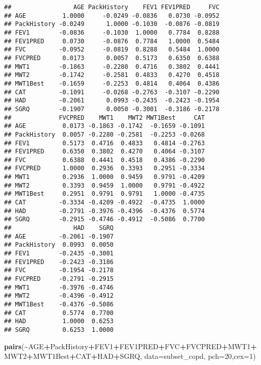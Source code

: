\documentclass[
]{article}
\newenvironment{Shaded}{\begin{snugshade}}{\end{snugshade}}
\newcommand{\AttributeTok}[1]{\textcolor[rgb]{0.13,0.29,0.53}{#1}}
\newcommand{\DecValTok}[1]{\textcolor[rgb]{0.00,0.00,0.81}{#1}}
\newcommand{\FunctionTok}[1]{\textcolor[rgb]{0.13,0.29,0.53}{\textbf{#1}}}
\newcommand{\NormalTok}[1]{#1}
\newcommand{\SpecialCharTok}[1]{\textcolor[rgb]{0.81,0.36,0.00}{\textbf{#1}}}
\begin{document}
\begin{verbatim}
##                 AGE PackHistory    FEV1 FEV1PRED     FVC
## AGE          1.0000     -0.0249 -0.0836   0.0730 -0.0952
## PackHistory -0.0249      1.0000 -0.1030  -0.0876 -0.0819
## FEV1        -0.0836     -0.1030  1.0000   0.7784  0.8288
## FEV1PRED     0.0730     -0.0876  0.7784   1.0000  0.5484
## FVC         -0.0952     -0.0819  0.8288   0.5484  1.0000
## FVCPRED      0.0173      0.0057  0.5173   0.6350  0.6388
## MWT1        -0.1863     -0.2280  0.4716   0.3802  0.4441
## MWT2        -0.1742     -0.2581  0.4833   0.4270  0.4518
## MWT1Best    -0.1659     -0.2253  0.4814   0.4064  0.4386
## CAT         -0.1091     -0.0268 -0.2763  -0.3107 -0.2290
## HAD         -0.2061      0.0993 -0.2435  -0.2423 -0.1954
## SGRQ        -0.1907      0.0050 -0.3001  -0.3186 -0.2178
##             FVCPRED    MWT1    MWT2 MWT1Best     CAT
## AGE          0.0173 -0.1863 -0.1742  -0.1659 -0.1091
## PackHistory  0.0057 -0.2280 -0.2581  -0.2253 -0.0268
## FEV1         0.5173  0.4716  0.4833   0.4814 -0.2763
## FEV1PRED     0.6350  0.3802  0.4270   0.4064 -0.3107
## FVC          0.6388  0.4441  0.4518   0.4386 -0.2290
## FVCPRED      1.0000  0.2936  0.3393   0.2951 -0.3334
## MWT1         0.2936  1.0000  0.9459   0.9791 -0.4209
## MWT2         0.3393  0.9459  1.0000   0.9791 -0.4922
## MWT1Best     0.2951  0.9791  0.9791   1.0000 -0.4735
## CAT         -0.3334 -0.4209 -0.4922  -0.4735  1.0000
## HAD         -0.2791 -0.3976 -0.4396  -0.4376  0.5774
## SGRQ        -0.2915 -0.4746 -0.4912  -0.5086  0.7700
##                 HAD    SGRQ
## AGE         -0.2061 -0.1907
## PackHistory  0.0993  0.0050
## FEV1        -0.2435 -0.3001
## FEV1PRED    -0.2423 -0.3186
## FVC         -0.1954 -0.2178
## FVCPRED     -0.2791 -0.2915
## MWT1        -0.3976 -0.4746
## MWT2        -0.4396 -0.4912
## MWT1Best    -0.4376 -0.5086
## CAT          0.5774  0.7700
## HAD          1.0000  0.6253
## SGRQ         0.6253  1.0000
\end{verbatim}

\begin{Shaded}
\begin{Highlighting}[]
\FunctionTok{pairs}\NormalTok{(}\SpecialCharTok{\textasciitilde{}}\NormalTok{AGE}\SpecialCharTok{+}\NormalTok{PackHistory}\SpecialCharTok{+}\NormalTok{FEV1}\SpecialCharTok{+}\NormalTok{FEV1PRED}\SpecialCharTok{+}\NormalTok{FVC}\SpecialCharTok{+}\NormalTok{FVCPRED}\SpecialCharTok{+}\NormalTok{MWT1}\SpecialCharTok{+}\NormalTok{MWT2}\SpecialCharTok{+}\NormalTok{MWT1Best}\SpecialCharTok{+}\NormalTok{CAT}\SpecialCharTok{+}\NormalTok{HAD}\SpecialCharTok{+}\NormalTok{SGRQ, }\AttributeTok{data=}\NormalTok{subset\_copd, }\AttributeTok{pch=}\DecValTok{20}\NormalTok{,}\AttributeTok{cex=}\DecValTok{1}\NormalTok{)}
\end{Highlighting}
\end{Shaded}
\end{document}
